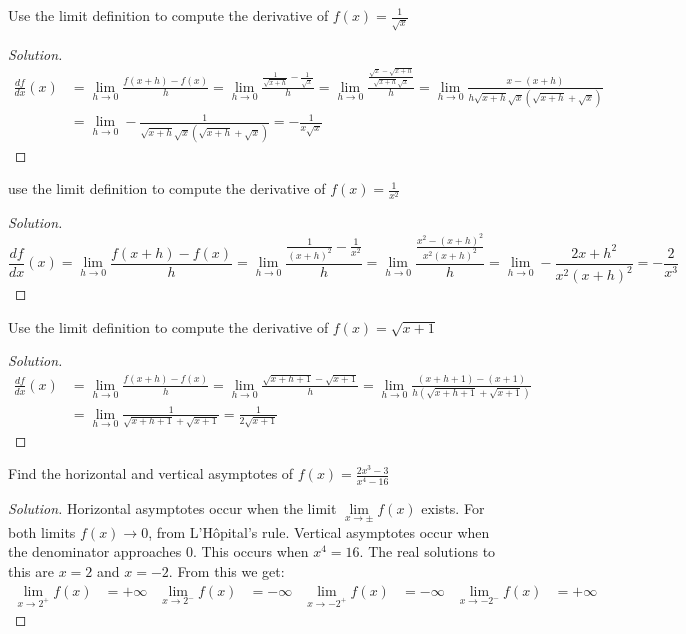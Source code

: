 \documentclass[crop=false,class=book,oneside]{standalone}
\begin{document}
\begin{problem}
Use the limit definition to compute the derivative of $f(x)=\frac{1}{\sqrt{x}}$
\end{problem}
\begin{proof}[Solution]
\begin{align*}
    \frac{df}{dx}(x)&=\underset{h\rightarrow 0}{\lim}\frac{f(x+h)-f(x)}{h}=\underset{h\rightarrow 0}{\lim}\frac{\frac{1}{\sqrt{x+h}}-\frac{1}{\sqrt{x}}}{h}=\underset{h\rightarrow 0}{\lim}\frac{\frac{\sqrt{x}-\sqrt{x+h}}{\sqrt{x+h}\sqrt{x}}}{h}=\underset{h\rightarrow 0}{\lim}\frac{x-(x+h)}{h\sqrt{x+h}\sqrt{x}(\sqrt{x+h}+\sqrt{x})}\\
    &=\underset{h\rightarrow 0}{\lim}-\frac{1}{\sqrt{x+h}\sqrt{x}(\sqrt{x+h}+\sqrt{x})}=-\frac{1}{x\sqrt{x}}
\end{align*}
\end{proof}
\begin{problem}
use the limit definition to compute the derivative of $f(x)=\frac{1}{x^{2}}$
\end{problem}
\begin{proof}[Solution]
\begin{equation*}
    \frac{df}{dx}(x)=\underset{h\rightarrow 0}{\lim}\frac{f(x+h)-f(x)}{h}=\underset{h\rightarrow 0}{\lim}\frac{\frac{1}{(x+h)^{2}}-\frac{1}{x^{2}}}{h}=\underset{h\rightarrow 0}{\lim}\frac{\frac{x^{2}-(x+h)^{2}}{x^{2}(x+h)^{2}}}{h}=\underset{h\rightarrow 0}{\lim}-\frac{2x+h^{2}}{x^{2}(x+h)^{2}}=-\frac{2}{x^{3}}
\end{equation*}
\end{proof}
\begin{problem}
Use the limit definition to compute the derivative of $f(x)=\sqrt{x+1}$
\end{problem}
\begin{proof}[Solution]
\begin{align*}
    \frac{df}{dx}(x)&=\underset{h\rightarrow 0}{\lim}\frac{f(x+h)-f(x)}{h}=\underset{h\rightarrow 0}{\lim}\frac{\sqrt{x+h+1}-\sqrt{x+1}}{h}=\underset{h\rightarrow 0}{\lim}\frac{(x+h+1)-(x+1)}{h(\sqrt{x+h+1}+\sqrt{x+1})}\\
    &=\underset{h\rightarrow 0}{\lim}\frac{1}{\sqrt{x+h+1}+\sqrt{x+1}}=\frac{1}{2\sqrt{x+1}}
\end{align*}
\end{proof}
\begin{problem}
Find the horizontal and vertical asymptotes of $f(x)=\frac{2x^{3}-3}{x^{4}-16}$
\end{problem}
\begin{proof}[Solution]
Horizontal asymptotes occur when the limit $\underset{x\rightarrow\pm}{\lim}f(x)$ exists. For both limits $f(x)\rightarrow 0$, from L'H\^{o}pital's rule. Vertical asymptotes occur when the denominator approaches 0. This occurs when $x^{4}=16$. The real solutions to this are $x=2$ and $x=-2$. From this we get:
\begin{align*}
    \underset{x\rightarrow 2^{+}}{\lim}f(x)&=+\infty&\underset{x\rightarrow 2^{-}}{\lim}f(x)&=-\infty&\underset{x\rightarrow -2^{+}}{\lim}f(x)&=-\infty&\underset{x\rightarrow -2^{-}}{\lim}f(x)&=+\infty
\end{align*}
\end{proof}
\end{document}
